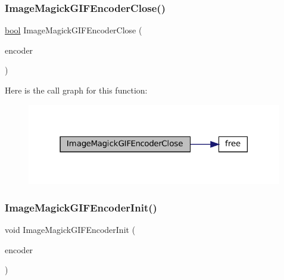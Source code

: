 \subsubsection{\texorpdfstring{Image\+Magick\+G\+I\+F\+Encoder\+Close()}{ImageMagickGIFEncoderClose()}}
{\footnotesize\ttfamily \mbox{\hyperlink{libretro_8h_a4a26dcae73fb7e1528214a068aca317e}{bool}} Image\+Magick\+G\+I\+F\+Encoder\+Close (\begin{DoxyParamCaption}\item[{struct \mbox{\hyperlink{imagemagick-gif-encoder_8h_struct_image_magick_g_i_f_encoder}{Image\+Magick\+G\+I\+F\+Encoder}} $\ast$}]{encoder }\end{DoxyParamCaption})}

Here is the call graph for this function\+:
\nopagebreak
\begin{figure}[H]
\begin{center}
\leavevmode
\includegraphics[width=316pt]{imagemagick-gif-encoder_8c_afbb1ff524c5364a4e5470189f8501204_cgraph}
\end{center}
\end{figure}
\mbox{\label{imagemagick-gif-encoder_8c_a09cc198e1bf6838fe97da63133398315}} 
\subsubsection{\texorpdfstring{Image\+Magick\+G\+I\+F\+Encoder\+Init()}{ImageMagickGIFEncoderInit()}}
{\footnotesize\ttfamily void Image\+Magick\+G\+I\+F\+Encoder\+Init (\begin{DoxyParamCaption}\item[{struct \mbox{\hyperlink{imagemagick-gif-encoder_8h_struct_image_magick_g_i_f_encoder}{Image\+Magick\+G\+I\+F\+Encoder}} $\ast$}]{encoder }\end{DoxyParamCaption})}

